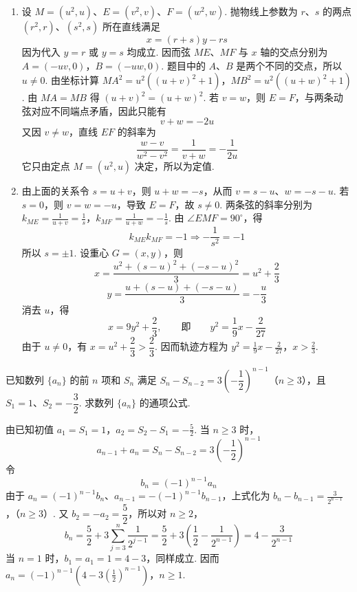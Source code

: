 \begin{solution}
\begin{enumerate}
\item 设 \(M=(u^2,u)\)、\(E=(v^2,v)\)、\(F=(w^2,w)\). 抛物线上参数为 \(r\)、\(s\) 的两点 \((r^2,r)\)、\((s^2,s)\) 所在直线满足
\[
x=(r+s)y-rs
\]
因为代入 \(y=r\) 或 \(y=s\) 均成立. 因而弦 \(ME\)、\(MF\) 与 \(x\) 轴的交点分别为
\(A=(-uv,0)\)，\(B=(-uw,0)\).
题目中的 \(A\)、\(B\) 是两个不同的交点，所以 \(u\neq0\). 由坐标计算
\(MA^2=u^2\left((u+v)^2+1\right)\)，\(MB^2=u^2\left((u+w)^2+1\right)\).
由 \(MA=MB\) 得 \((u+v)^2=(u+w)^2\). 若 \(v=w\)，则 \(E=F\)，与两条动弦对应不同端点矛盾，因此只能有
\[
v+w=-2u
\]
又因 \(v\neq w\)，直线 \(EF\) 的斜率为
\[
\frac{w-v}{w^2-v^2}=\frac1{v+w}=-\frac1{2u}
\]
它只由定点 \(M=(u^2,u)\) 决定，所以为定值.

\item 由上面的关系令 \(s=u+v\)，则 \(u+w=-s\)，从而 \(v=s-u\)、\(w=-s-u\). 若 \(s=0\)，则 \(v=w=-u\)，导致 \(E=F\)，故 \(s\neq0\). 两条弦的斜率分别为
\(k_{ME}=\frac1{u+v}=\frac1s\)，\(k_{MF}=\frac1{u+w}=-\frac1s\).
由 \(\angle EMF=90^{\circ}\)，得
\[
k_{ME}k_{MF}=-1\Longrightarrow -\frac1{s^2}=-1
\]
所以 \(s=\pm1\). 设重心 \(G=(x,y)\)，则
\[
x=\frac{u^2+(s-u)^2+(-s-u)^2}{3}=u^2+\frac23
\]
\[
y=\frac{u+(s-u)+(-s-u)}{3}=-\frac u3
\]
消去 \(u\)，得
\[
x=9y^2+\frac23,
\qquad\text{即}\qquad
y^2=\frac19x-\frac{2}{27}
\]
由于 \(u\neq0\)，有 \(x=u^2+\dfrac23>\dfrac23\). 因而轨迹方程为
\(y^2=\frac19x-\frac{2}{27}\)，\(x>\frac23\).
\end{enumerate}
\end{solution}

\begin{problem}
已知数列 \(\{a_n\}\) 的前 \(n\) 项和 \(S_n\) 满足 \(S_n-S_{n-2}=3\left(-\dfrac12\right)^{n-1}\)（\(n\geqslant3\)），且 \(S_1=1\)、\(S_2=-\dfrac32\). 求数列 \(\{a_n\}\) 的通项公式.
\end{problem}

\begin{solution}
由已知初值
\(a_1=S_1=1\)，\(a_2=S_2-S_1=-\frac52\).
当 \(n\geqslant3\) 时，
\[
a_{n-1}+a_n=S_n-S_{n-2}=3\left(-\frac12\right)^{n-1}
\]
令
\[
b_n=(-1)^{n-1}a_n
\]
由于 \(a_n=(-1)^{n-1}b_n\)、\(a_{n-1}=-(-1)^{n-1}b_{n-1}\)，上式化为
\(b_n-b_{n-1}=\frac3{2^{n-1}}\)，（\(n\geqslant3\)）.
又 \(b_2=-a_2=\dfrac52\)，所以对 \(n\geqslant2\)，
\[
b_n=\frac52+3\sum_{j=3}^{n}\frac1{2^{j-1}}
=\frac52+3\left(\frac12-\frac1{2^{n-1}}\right)
=4-\frac3{2^{n-1}}
\]
当 \(n=1\) 时，\(b_1=a_1=1=4-3\)，同样成立. 因而
\(a_n=(-1)^{n-1}\left(4-3\left(\frac12\right)^{n-1}\right)\)，\(n\geqslant1\).
\end{solution}
